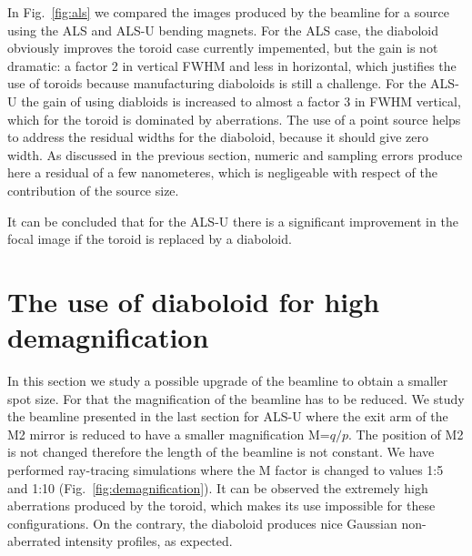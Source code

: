 \documentclass{iucr}              %
\newcommand{\inred}[1]{{\color{red}#1}}
\begin{document}
In Fig.~\ref{fig:als} we compared the images produced by the beamline for a source using the ALS and ALS-U bending magnets. For the ALS case, the diaboloid obviously improves the toroid case currently impemented, but the gain is not dramatic: a factor 2 in vertical FWHM and less in horizontal, which justifies the use of toroids because manufacturing diaboloids is still a challenge. For the ALS-U the gain of using diabloids is increased to almost a factor 3 in FWHM vertical, which for the toroid is dominated by aberrations.
The use of a point source helps to address the residual widths for the diaboloid, because it should give zero width. As discussed in the previous section, numeric and sampling errors produce here a residual of a few nanometeres, which is negligeable with respect of the contribution of the source size. %

It can be concluded that for the ALS-U there is a significant improvement in the focal image if the toroid is replaced by a diaboloid.

\section{The use of diaboloid for high demagnification}
\label{sec:scan}

In this section we study a possible upgrade of the beamline to obtain a smaller spot size. For that the magnification of the beamline has to be reduced. We study the beamline presented in the last section for ALS-U where the exit arm of the M2 mirror is reduced to have a smaller magnification M=$q/p$. The position of M2 is not changed therefore the length of the beamline is not constant. We have performed ray-tracing simulations where the M factor is changed to values 1:5 and 1:10 (Fig.~\ref{fig:demagnification}). It can be observed the extremely high aberrations produced by the toroid, which makes its use impossible for these configurations. On the contrary, the diaboloid produces nice Gaussian non-aberrated intensity profiles, as expected.
\end{document}
